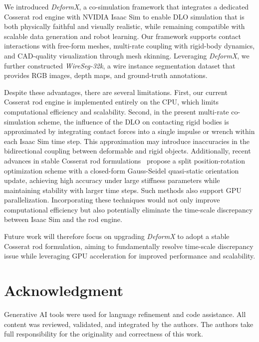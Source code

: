 \documentclass[letterpaper, 10 pt, conference]{ieeeconf}  %
\begin{document}
We introduced \textit{DeformX}, a co-simulation framework that integrates a dedicated Cosserat rod engine with NVIDIA Isaac Sim to enable DLO simulation that is both physically faithful and visually realistic, while remaining compatible with scalable data generation and robot learning. Our framework supports contact interactions with free-form meshes, multi-rate coupling with rigid-body dynamics, and CAD-quality visualization through mesh skinning. Leveraging \textit{DeformX}, we further constructed \textit{WireSeg-32k}, a wire instance segmentation dataset that provides RGB images, depth maps, and ground-truth annotations.

Despite these advantages, there are several limitations. First, our current Cosserat rod engine is implemented entirely on the CPU, which limits computational efficiency and scalability. Second, in the present multi-rate co-simulation scheme, the influence of the DLO on contacting rigid bodies is approximated by integrating contact forces into a single impulse or wrench within each Isaac Sim time step. This approximation may introduce inaccuracies in the bidirectional coupling between deformable and rigid objects. Additionally, recent advances in stable Cosserat rod formulations~\cite{stable_rod} propose a split position-rotation optimization scheme with a closed-form Gauss-Seidel quasi-static orientation update, achieving high accuracy under large stiffness parameters while maintaining stability with larger time steps. Such methods also support GPU parallelization. Incorporating these techniques would not only improve computational efficiency but also potentially eliminate the time-scale discrepancy between Isaac Sim and the rod engine.

Future work will therefore focus on upgrading \textit{DeformX} to adopt a stable Cosserat rod formulation, aiming to fundamentally resolve time-scale discrepancy issue while leveraging GPU acceleration for improved performance and scalability.

\section{Acknowledgment}
Generative AI tools were used for language refinement and code assistance. All content was reviewed, validated, and integrated by the authors. The authors take full responsibility for the originality and correctness of this work.



\end{document}

